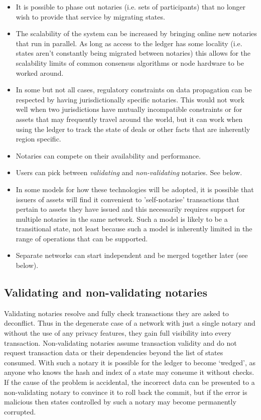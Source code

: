 \documentclass{article}
\begin{document}
\begin{itemize}
\item It is possible to phase out notaries (i.e. sets of participants) that no longer wish to provide that service by
migrating states.
\item The scalability of the system can be increased by bringing online new notaries that run in parallel. As long as access
to the ledger has some locality (i.e. states aren't constantly being migrated between notaries) this allows for the scalability
limits of common consensus algorithms or node hardware to be worked around.
\item In some but not all cases, regulatory constraints on data propagation can be respected by having jurisdictionally
specific notaries. This would not work well when two jurisdictions have mutually incompatible constraints or for assets that
may frequently travel around the world, but it can work when using the ledger to track the state of deals or other facts that
are inherently region specific.
\item Notaries can compete on their availability and performance.
\item Users can pick between \emph{validating} and \emph{non-validating} notaries. See below.
\item In some models for how these technologies will be adopted, it is possible that issuers of assets will find it
convenient to 'self-notarise' transactions that pertain to assets they have issued and this necessarily requires
support for multiple notaries in the same network. Such a model is likely to be a transitional state, not least
because such a model is inherently limited in the range of operations that can be supported.
\item Separate networks can start independent and be merged together later (see below).
\end{itemize}

\subsection{Validating and non-validating notaries}\label{sec:non-validating-notaries}

Validating notaries resolve and fully check transactions they are asked to deconflict. Thus in the degenerate case of a
network with just a single notary and without the use of any privacy features, they gain full visibility into every
transaction. Non-validating notaries assume transaction validity and do not request transaction data or their
dependencies beyond the list of states consumed. With such a notary it is possible for the ledger to become `wedged', as
anyone who knows the hash and index of a state may consume it without checks. If the cause of the problem is accidental,
the incorrect data can be presented to a non-validating notary to convince it to roll back the commit, but if the error
is malicious then states controlled by such a notary may become permanently corrupted.
\end{document}
